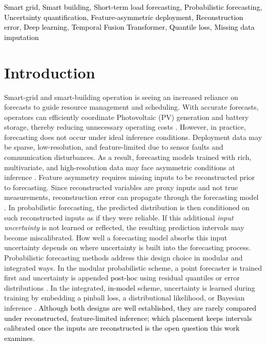 \documentclass[final,10pt,1p,authoryear]{elsarticle}
\theoremstyle{definition}
\begin{document}
\begin{frontmatter}
\begin{keyword}
\textcolor{black}{Smart grid, Smart building, Short-term load forecasting, Probabilistic forecasting, Uncertainty quantification, Feature-asymmetric deployment, Reconstruction error, Deep learning, Temporal Fusion Transformer, Quantile loss, Missing data imputation}
\end{keyword}
\end{frontmatter}

\section{Introduction}\label{background}
Smart-grid and smart-building operation is seeing an increased reliance on forecasts to guide resource management and scheduling. With accurate forecasts, operators can efficiently coordinate Photovoltaic (PV) generation and battery storage, thereby reducing unnecessary operating costs \citet{arevalo2025smart,almihat2025role,el2024revolutionizing}. However, in practice, forecasting does not occur under ideal inference conditions. Deployment data may be sparse, low-resolution, and feature-limited due to sensor faults and communication disturbances. As a result, forecasting models trained with rich, multivariate, and high-resolution data may face asymmetric conditions at inference \citet{sarah2025lightweight}. Feature asymmetry requires missing inputs to be reconstructed prior to forecasting. Since reconstructed variables are proxy inputs and not true measurements, reconstruction error can propagate through the forecasting model \citet{11359042}. In probabilistic forecasting, the predicted distribution is then conditioned on such reconstructed inputs as if they were reliable. If this additional \emph{input uncertainty} is not learned or reflected, the resulting prediction intervals may become miscalibrated. How well a forecasting model absorbs this input uncertainty depends on where uncertainty is built into the forecasting process. Probabilistic forecasting methods address this design choice in modular and integrated ways. In the modular probabilistic scheme, a point forecaster is trained first and uncertainty is appended \textcolor{black}{post-hoc} using residual quantiles or error distributions \citet{khajeh2022applications,kaur2022energy,meisenbacher2022review}. In the integrated, \textcolor{black}{in-model} scheme, uncertainty is learned during training by embedding a pinball loss, a distributional likelihood, or Bayesian inference \citet{lucas2021probabilistic,brusaferri2022probabilistic,mahajan2024bayesian,ozdemir2024probabilistic}. \textcolor{black}{Although both designs are well established, they are rarely compared under reconstructed, feature-limited inference; which placement keeps intervals calibrated once the inputs are reconstructed is the open question this work examines.}
\end{document}
